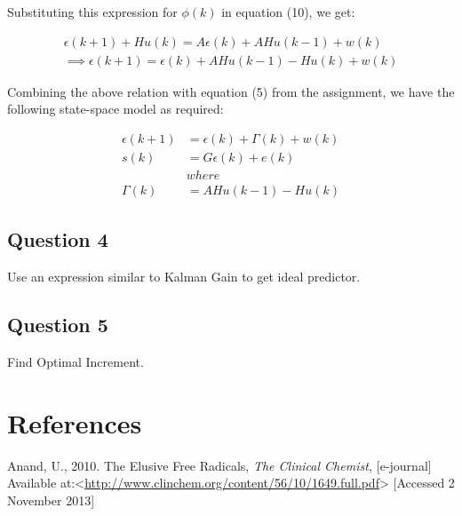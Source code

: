 \documentclass[12pt]{report}
\begin{document}
Substituting this expression for $\phi(k)$ in equation (10), we get:

\begin{equation*}
\begin{aligned}
\epsilon(k+1) + Hu(k) = A\epsilon(k) + AHu(k-1) + w(k)\\
\implies \epsilon(k+1) = \epsilon(k) + AHu(k-1) - Hu(k) + w(k)
\end{aligned}
\end{equation*} 

Combining the above relation with equation (5) from the assignment, we have the following state-space model as required:

\begin{equation*}
\begin{aligned}
\epsilon(k+1) &= \epsilon(k) + \Gamma(k) + w(k)\\
s(k) &= G\epsilon(k) + e(k)\\
&where\\
\Gamma(k) &= AHu(k-1) - Hu(k)
\end{aligned}
\end{equation*} 


\subsection*{Question 4}

Use an expression similar to Kalman Gain to get ideal predictor.

\subsection*{Question 5}

Find Optimal Increment.

\newpage
\section*{References}

Anand, U., 2010. The Elusive Free Radicals, \textit{The Clinical Chemist,} [e-journal] Available at:<\url{http://www.clinchem.org/content/56/10/1649.full.pdf}> [Accessed 2 November 2013]
\newline
\newline
\end{document}
